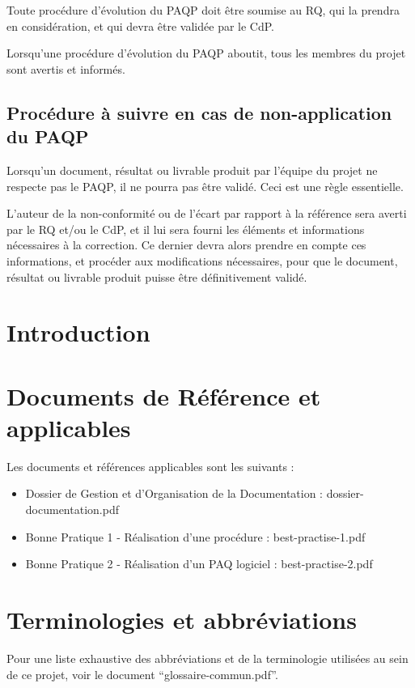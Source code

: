 \documentclass[a4paper]{article}
\begin{document}
Toute procédure d'évolution du PAQP doit être soumise au RQ, qui la prendra en considération, et qui devra être validée par le CdP.

Lorsqu'une procédure d'évolution du PAQP aboutit, tous les membres du projet sont avertis et informés.

\subsection{Procédure à suivre en cas de non-application du  PAQP}

Lorsqu'un document, résultat ou livrable produit par l'équipe du projet ne respecte pas le PAQP, il ne pourra pas être validé. Ceci est une règle essentielle.

L'auteur de la non-conformité ou de l'écart par rapport à la référence sera averti par le RQ et/ou le CdP, et il lui sera fourni les éléments et informations nécessaires à la correction. Ce dernier devra alors prendre en compte ces informations, et procéder aux modifications nécessaires, pour que le document, résultat ou livrable produit puisse être définitivement validé.

\section{Introduction}

\section{Documents de Référence et applicables}

Les documents et références applicables sont les suivants :

\begin{itemize}
\item Dossier de Gestion et d'Organisation de la Documentation : dossier-documentation.pdf
\item Bonne Pratique 1 - Réalisation d'une procédure : best-practise-1.pdf
\item Bonne Pratique 2 - Réalisation d'un PAQ logiciel : best-practise-2.pdf
\end{itemize}


\section{Terminologies et abbréviations}

Pour une liste exhaustive des abbréviations et de la terminologie utilisées au sein de ce projet, voir le document ``glossaire-commun.pdf''.
\end{document}
